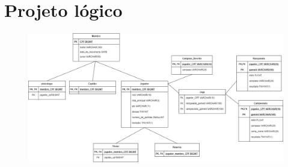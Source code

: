 \documentclass[]{article}
\begin{document}
\section{Projeto lógico}
\begin{figure}[H]
    \centering
    \includegraphics[width=17cm]{logico}
\end{figure}
\end{document}
